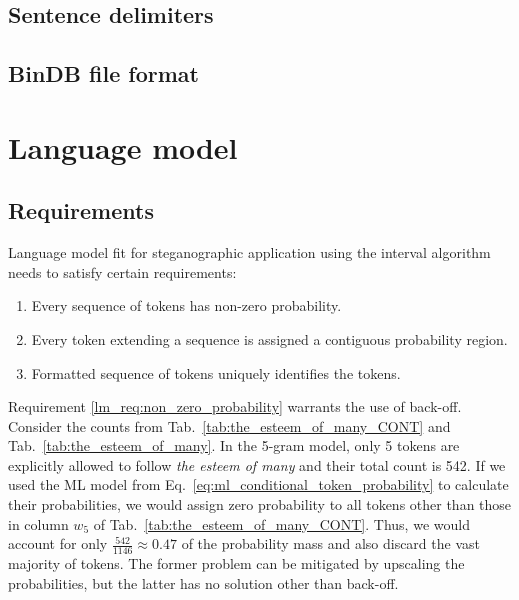 \documentclass{IIBproject}
\begin{document}
\subsection{Sentence delimiters}

\subsection{BinDB file format}

\section{Language model}

\subsection{Requirements}

Language model fit for steganographic application using the interval algorithm needs to satisfy certain requirements:

\begin{enumerate}
  \item \label{lm_req:non_zero_probability} Every sequence of tokens has non-zero probability.
  \item \label{lm_req:contiguous_probability} Every token extending a sequence is assigned a contiguous probability region.
  \item \label{lm_req:hidden_symbols} Formatted sequence of tokens uniquely identifies the tokens.
\end{enumerate}

Requirement \ref{lm_req:non_zero_probability} warrants the use of back-off. Consider the counts from Tab.~\ref{tab:the_esteem_of_many_CONT} and Tab.~\ref{tab:the_esteem_of_many}. In the 5-gram model, only 5 tokens are explicitly allowed to follow \emph{the esteem of many} and their total count is 542. If we used the ML model from Eq.~\ref{eq:ml_conditional_token_probability} to calculate their probabilities, we would assign zero probability to all tokens other than those in column $w_5$ of Tab.~\ref{tab:the_esteem_of_many_CONT}. Thus, we would account for only $\frac {542} {1146} \approx 0.47$ of the probability mass and also discard the vast majority of tokens. The former problem can be mitigated by upscaling the probabilities, but the latter has no solution other than back-off.
\end{document}
